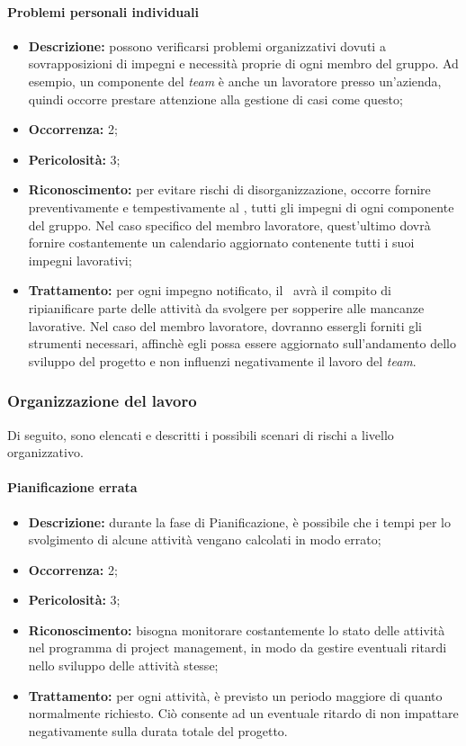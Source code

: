 \paragraph{Problemi personali individuali}
\begin{itemize}
	\item \textbf{Descrizione:} possono verificarsi problemi organizzativi dovuti a sovrapposizioni di impegni e necessità proprie di ogni membro del gruppo. Ad esempio, un componente del \textit{team} è anche un lavoratore presso un'azienda, quindi occorre prestare attenzione alla gestione di casi come questo;
	\item \textbf{Occorrenza:} 2;
	\item \textbf{Pericolosità:} 3;
	\item \textbf{Riconoscimento:} per evitare rischi di disorganizzazione, occorre fornire preventivamente e tempestivamente al \textit{\Res}, tutti gli impegni di ogni componente del gruppo. Nel caso specifico del membro lavoratore, quest'ultimo dovrà fornire costantemente un calendario aggiornato contenente tutti i suoi impegni lavorativi;
	\item \textbf{Trattamento:} per ogni impegno notificato, il \textit{\Res}\ avrà il compito di ripianificare parte delle attività da svolgere per sopperire alle mancanze lavorative. Nel caso del membro lavoratore, dovranno essergli forniti gli strumenti necessari, affinchè egli possa essere aggiornato sull'andamento dello sviluppo del progetto e non influenzi negativamente il lavoro del \textit{team}.
\end{itemize}

\subsubsection{Organizzazione del lavoro}

Di seguito, sono elencati e descritti i possibili scenari di rischi a livello organizzativo.

\paragraph{Pianificazione errata}
\begin{itemize}
	\item \textbf{Descrizione:} durante la fase di Pianificazione, è possibile che i tempi per lo svolgimento di alcune attività vengano calcolati in modo errato;
	\item \textbf{Occorrenza:} 2;
	\item \textbf{Pericolosità:} 3;
	\item \textbf{Riconoscimento:} bisogna monitorare costantemente lo stato delle attività nel programma di project management, in modo da gestire eventuali ritardi nello sviluppo delle attività stesse;
	\item \textbf{Trattamento:} per ogni attività, è previsto un periodo maggiore di quanto normalmente richiesto. Ciò consente ad un eventuale ritardo di non impattare negativamente sulla durata totale del progetto.
\end{itemize}


